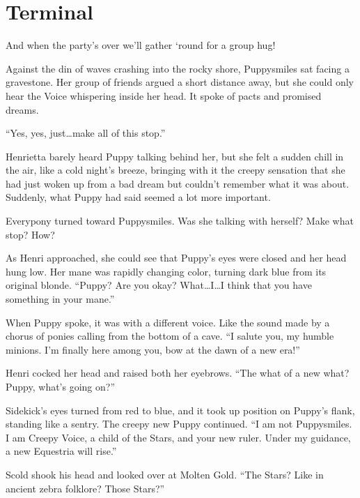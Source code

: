 
\chapter{Terminal}


\begin{intro}
And when the party's over we'll gather `round for a group hug!
\end{intro}


Against the din of waves crashing into the rocky shore, Puppysmiles sat facing a gravestone. Her group of friends argued a short distance away, but she could only hear the Voice whispering inside her head. It spoke of pacts and promised dreams.

``Yes, yes, just\dots make all of this stop.''

Henrietta barely heard Puppy talking behind her, but she felt a sudden chill in the air, like a cold night's breeze, bringing with it the creepy sensation that she had just woken up from a bad dream but couldn't remember what it was about. Suddenly, what Puppy had said seemed a lot more important.

Everypony turned toward Puppysmiles. Was she talking with herself? Make what stop? How?

As Henri approached, she could see that Puppy's eyes were closed and her head hung low. Her mane was rapidly changing color, turning dark blue from its original blonde. ``Puppy? Are you okay? What\dots I\dots I think that you have something in your mane.''

When Puppy spoke, it was with a different voice. Like the sound made by a chorus of ponies calling from the bottom of a cave. ``I salute you, my humble minions. I'm finally here among you, bow at the dawn of a new era!''

Henri cocked her head and raised both her eyebrows. ``The what of a new what? Puppy, what's going on?''

Sidekick's eyes turned from red to blue, and it took up position on Puppy's flank, standing like a sentry. The creepy new Puppy continued. ``I am not Puppysmiles. I am Creepy Voice, a child of the Stars, and your new ruler. Under my guidance, a new Equestria will rise.''

Scold shook his head and looked over at Molten Gold. ``The Stars? Like in ancient zebra folklore? Those Stars?''

